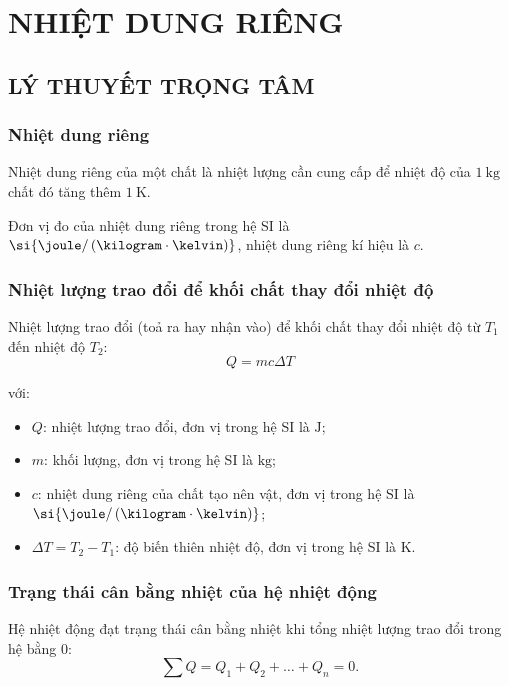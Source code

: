 \section{NHIỆT DUNG RIÊNG}
\subsection{LÝ THUYẾT TRỌNG TÂM}
\subsubsection{Nhiệt dung riêng}
\begin{boxdn}
	Nhiệt dung riêng của một chất là nhiệt lượng cần cung cấp để nhiệt độ của $\SI{1}{\kilogram}$ chất đó tăng thêm $\SI{1}{\kelvin}$.
\end{boxdn}
Đơn vị đo của nhiệt dung riêng trong hệ SI là $\si{\joule/\left(\kilogram\cdot\kelvin\right)}$, nhiệt dung riêng kí hiệu là $c$.
\subsubsection{Nhiệt lượng trao đổi để khối chất thay đổi nhiệt độ}
\begin{boxdn}
	Nhiệt lượng trao đổi (toả ra hay nhận vào) để khối chất thay đổi nhiệt độ từ $T_1$ đến nhiệt độ $T_2$:
	$$Q=mc\Delta T$$
\end{boxdn}
với:
\begin{itemize}
	\item $Q$: nhiệt lượng trao đổi, đơn vị trong hệ SI là $\si{\joule}$;
	\item $m$: khối lượng, đơn vị trong hệ SI là $\si{\kilogram}$;
	\item $c$: nhiệt dung riêng của chất tạo nên vật, đơn vị trong hệ SI là $\si{\joule/\left(\kilogram\cdot\kelvin\right)}$;
	\item $\Delta T=T_2-T_1$: độ biến thiên nhiệt độ, đơn vị trong hệ SI là $\si{\kelvin}$.
\end{itemize}
\subsubsection{Trạng thái cân bằng nhiệt của hệ nhiệt động}
\begin{boxdn}
	Hệ nhiệt động đạt trạng thái cân bằng nhiệt khi tổng nhiệt lượng trao đổi trong hệ bằng 0:
	$$\sum Q=Q_1+Q_2+\dots+Q_n=0.$$
\end{boxdn}
